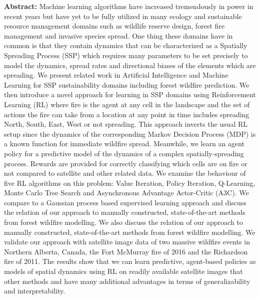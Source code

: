 \documentclass{article}
\begin{document}

\textbf{Abstract:} Machine learning algorithms have increased tremendously in power in recent years but have yet to be fully utilized in many ecology and sustainable resource management domains such as wildlife reserve design, forest fire management and invasive species spread. One thing these domains have in common is that they contain dynamics that can be characterized as a Spatially Spreading Process (SSP) which requires many parameters to be set precisely to model the dynamics, spread rates and directional biases of the elements which are spreading. We present related work in Artificial Intelligence and Machine Learning for SSP sustainability domains including forest wildfire prediction. We then introduce a novel approach for learning in SSP domains using Reinforcement Learning (RL) where fire is the agent at any cell in the landscape and the set of actions the fire can take from a location at any point in time includes spreading North, South, East, West or not spreading. This approach inverts the usual RL setup since the dynamics of the corresponding Markov Decision Process (MDP) is a known function for immediate wildfire spread. Meanwhile, we learn an agent policy for a predictive model of the dynamics of a complex spatially-spreading process. Rewards are provided for correctly classifying which cells are on fire or not compared to satellite and other related data. We examine the behaviour of five RL algorithms on this problem: Value Iteration, Policy Iteration, Q-Learning, Monte Carlo Tree Search and Asynchronous Advantage Actor-Critic (A3C). We compare to a Gaussian process based supervised learning approach and discuss the relation of our approach to manually constructed, state-of-the-art methods from forest wildfire modelling. We also discuss the relation of our approach to manually constructed, state-of-the-art methods from forest wildfire modelling. We validate our approach with satellite image data of two massive wildfire events in Northern Alberta, Canada, the Fort McMurray fire of 2016 and the Richardson fire of 2011. The results show that we can learn predictive, agent-based policies as models of spatial dynamics using RL on readily available satellite images that other methods and have many additional advantages in terms of generalizability and interpretability.
\end{document}
